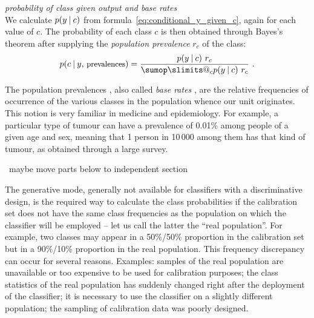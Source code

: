 \documentclass[\ifafour a4paper,12pt,\else a5paper,10pt,\fi%
onecolumn,oneside,article,%
british%
]{memoir}
\makeatletter
\theoremstyle{remark}
\theoremstyle{innote}
\def\sum{\DOTSI\sumop\slimits@}
\newcommand*{\puzzle}{{\fontencoding{U}\fontfamily{fontawesometwo}\selectfont\symbol{225}}}
\newcommand*{\wrench}{{\fontencoding{U}\fontfamily{fontawesomethree}\selectfont\symbol{114}}}
\newcommand{\mynotew}[1]{{\footnotesize\color{notecolour}\wrench\ #1}}
\newcommand{\mynotez}[1]{{\footnotesize\color{notecolour}\puzzle\ #1}}
\newcommand*{\p}{\mathrm{p}}%
\renewcommand*{\|}[1][]{\nonscript\:#1\vert\nonscript\:\mathopen{}}
\newcommand*{\sect}{\S}%
\newcommand*{\chap}{ch.}%
\newcommand*{\texts}[1]{\text{\small #1}}
\newcommand*{\br}{r}
\makeatother
\begin{document}
\begin{description}[font=\textit]
\item[Generative mode:] \textit{probability of class given output and base rates}\\
  We calculate $p(y \| c)$ from formula~\eqref{eq:conditional_y_given_c}, again for each value of $c$. The probability of each class $c$ is then obtained through Bayes's theorem after supplying the \emph{population prevalence} $\br_{c}$ of the class:
  \begin{equation}
    \label{eq:bayes_baserate}
    p(c \| y,\, \texts{prevalences}) = \frac{p(y \| c)\ \br_{c}}{ \sum_{c} p(y \| c)\ \br_{c} } \ .
  \end{equation}
\end{description}
The population prevalences \autocites[\chap~3]{soxetal1988_r2013}[\sect~5.1]{huninketal2001_r2014}, also called \emph{base rates} \autocites{barhillel1980,axelsson2000}, are the relative frequencies of occurrence of the various classes in the population whence our unit originates. This notion is very familiar in medicine and epidemiology. For example, a particular type of tumour can have a prevalence of 0.01\% among people of a given age and sex, meaning that 1 person in 10\,000 among them has that kind of tumour, as obtained through a large survey.

\mynotew{maybe move parts below to independent section}

The generative mode, generally not available for classifiers with a discriminative design, is the required way to calculate the class probabilities if the calibration set does not have the same class frequencies as the population on which the classifier will be employed -- let us call the latter the \enquote{real population}. For example, two classes may appear in a 50\%/50\% proportion in the calibration set but in a  90\%/10\% proportion in the real population. This frequency discrepancy can occur for several reasons.  Examples: samples of the real population are unavailable or too expensive to be used for calibration purposes; the class statistics of the real population has suddenly changed right after the deployment of the classifier; it is necessary to use the classifier on a slightly different population; the sampling of calibration data was poorly designed.

\end{document}
